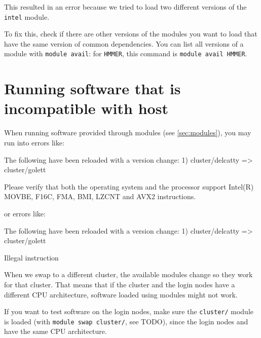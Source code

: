 This resulted in an error because we tried to load two different versions of the
\verb|intel| module.

To fix this, check if there are other versions of the modules you want to load
that have the same version of common dependencies. You can list all versions of
a module with \verb|module avail|: for \verb|HMMER|, this command is \verb|module avail HMMER|.
\fi

\ifgent

\section{Running software that is incompatible with host}

When running software provided through modules (see \autoref{sec:modules}),
you may run into errors like:

\begin{prompt}

The following have been reloaded with a version change:
  1) cluster/delcatty => cluster/golett


Please verify that both the operating system and the processor support Intel(R) MOVBE, F16C, FMA, BMI, LZCNT and AVX2 instructions.

\end{prompt}

or errors like:

\begin{prompt}

The following have been reloaded with a version change:
  1) cluster/delcatty => cluster/golett

Illegal instruction
\end{prompt}


When we swap to a different cluster, the available modules change so they work for that cluster.
That means that if the cluster and the login nodes have a different CPU architecture,
software loaded using modules might not work.

If you want to test software on the login nodes, make sure the \texttt{cluster/}
module is loaded (with \texttt{module swap cluster/}, see TODO), %
since the login nodes and  have the same CPU architecture.

